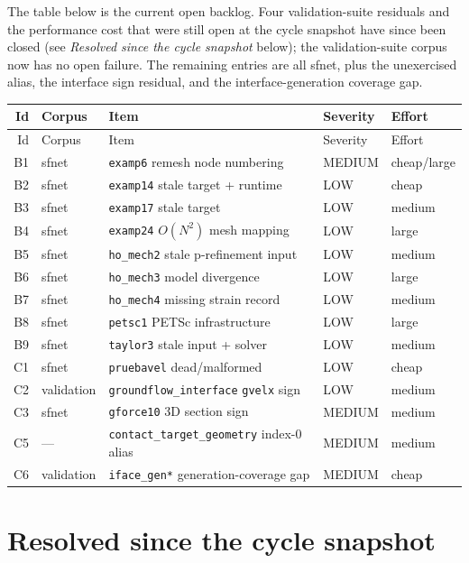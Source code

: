 \documentclass[11pt,a4paper]{report}
\newcommand{\code}[1]{\texttt{#1}}
\begin{document}
The table below is the current open backlog. Four validation-suite residuals
and the performance cost that were still open at the cycle snapshot have since
been closed (see \emph{Resolved since the cycle snapshot} below); the
validation-suite corpus now has no open failure. The remaining entries are all
sfnet, plus the unexercised alias, the interface sign residual, and the
interface-generation coverage gap.

\begin{longtable}{@{}r L{2.5cm} L{7.4cm} L{1.7cm} L{2.2cm}@{}}
\toprule
Id & Corpus & Item & Severity & Effort \\
\midrule
\endfirsthead
\toprule
Id & Corpus & Item & Severity & Effort \\
\midrule
\endhead
\bottomrule
\endlastfoot
B1 & sfnet & \code{examp6} remesh node numbering & MEDIUM & cheap/large \\
B2 & sfnet & \code{examp14} stale target + runtime & LOW & cheap \\
B3 & sfnet & \code{examp17} stale target & LOW & medium \\
B4 & sfnet & \code{examp24} $O(N^2)$ mesh mapping & LOW & large \\
B5 & sfnet & \code{ho\_\allowbreak mech2} stale p-refinement input & LOW & medium \\
B6 & sfnet & \code{ho\_\allowbreak mech3} model divergence & LOW & large \\
B7 & sfnet & \code{ho\_\allowbreak mech4} missing strain record & LOW & medium \\
B8 & sfnet & \code{petsc1} PETSc infrastructure & LOW & large \\
B9 & sfnet & \code{taylor3} stale input + solver & LOW & medium \\
C1 & sfnet & \code{pruebavel} dead/malformed & LOW & cheap \\
C2 & validation & \code{groundflow\_\allowbreak interface} \code{gvelx} sign & LOW & medium \\
C3 & sfnet & \code{gforce10} 3D section sign & MEDIUM & medium \\
C5 & --- & \code{contact\_\allowbreak target\_\allowbreak geometry} index-0 alias & MEDIUM & medium \\
C6 & validation & \code{iface\_\allowbreak gen*} generation-coverage gap & MEDIUM & cheap \\
\end{longtable}

\section{Resolved since the cycle snapshot}
\end{document}
